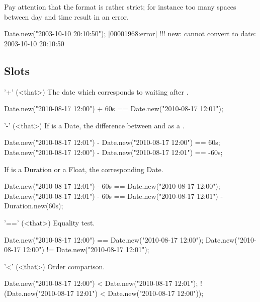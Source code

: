 Pay attention that the format is rather strict; for instance too many spaces
between day and time result in an error.

\begin{urbiscript}
Date.new("2003-10-10  20:10:50");
[00001968:error] !!! new: cannot convert to date: 2003-10-10  20:10:50
\end{urbiscript}

\subsection{Slots}

\begin{urbiscriptapi}
\item['+'](<that>)%
  The date which corresponds to waiting  
  after \this.
\begin{urbiassert}
Date.new("2010-08-17 12:00") + 60s == Date.new("2010-08-17 12:01");
\end{urbiassert}

\item['-'](<that>)%
  If  is a Date, the difference between \this and  as a
  .
\begin{urbiassert}
Date.new("2010-08-17 12:01") - Date.new("2010-08-17 12:00") ==  60s;
Date.new("2010-08-17 12:00") - Date.new("2010-08-17 12:01") == -60s;
\end{urbiassert}

If  is a Duration or a Float, the corresponding Date.

\begin{urbiassert}
Date.new("2010-08-17 12:01") - 60s == Date.new("2010-08-17 12:00");
Date.new("2010-08-17 12:01") - 60s
  == Date.new("2010-08-17 12:01") - Duration.new(60s);
\end{urbiassert}

\item['=='](<that>)%
  Equality test.
\begin{urbiassert}
Date.new("2010-08-17 12:00") == Date.new("2010-08-17 12:00");
Date.new("2010-08-17 12:00") != Date.new("2010-08-17 12:01");
\end{urbiassert}

\item['<'](<that>)%
  Order comparison.
\begin{urbiassert}
   Date.new("2010-08-17 12:00") < Date.new("2010-08-17 12:01");
! (Date.new("2010-08-17 12:01") < Date.new("2010-08-17 12:00"));
\end{urbiassert}


\end{urbiscriptapi}
